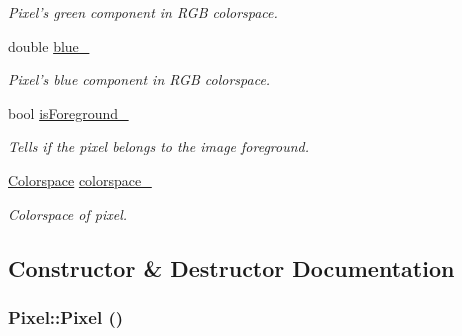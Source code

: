 \begin{CompactItemize}
\begin{CompactList}\small\item\em Pixel's green component in RGB colorspace. \item\end{CompactList}\item 
\hypertarget{class_pixel_9d2375a06d09fafc8390a89c0a9397b4}{
double \hyperlink{class_pixel_9d2375a06d09fafc8390a89c0a9397b4}{blue\_\-}}
\label{class_pixel_9d2375a06d09fafc8390a89c0a9397b4}

\begin{CompactList}\small\item\em Pixel's blue component in RGB colorspace. \item\end{CompactList}\item 
\hypertarget{class_pixel_c5e23dca7ce110bd906966dedf975fca}{
bool \hyperlink{class_pixel_c5e23dca7ce110bd906966dedf975fca}{isForeground\_\-}}
\label{class_pixel_c5e23dca7ce110bd906966dedf975fca}

\begin{CompactList}\small\item\em Tells if the pixel belongs to the image foreground. \item\end{CompactList}\item 
\hypertarget{class_pixel_df7d066dd31f59039561b541e29aa217}{
\hyperlink{_colorspace_8h_7a7e24cdb2a27271343f0adceff89f65}{Colorspace} \hyperlink{class_pixel_df7d066dd31f59039561b541e29aa217}{colorspace\_\-}}
\label{class_pixel_df7d066dd31f59039561b541e29aa217}

\begin{CompactList}\small\item\em Colorspace of pixel. \item\end{CompactList}\end{CompactItemize}


\subsection{Constructor \& Destructor Documentation}
\hypertarget{class_pixel_27ad99a2f705e635c42d242d530d4756}{
\subsubsection[Pixel]{\setlength{\rightskip}{0pt plus 5cm}Pixel::Pixel ()}}
\label{class_pixel_27ad99a2f705e635c42d242d530d4756}


